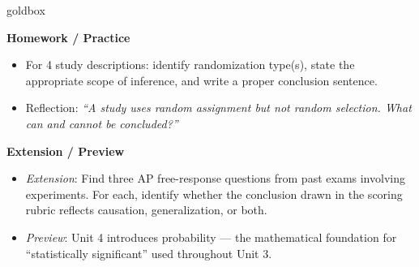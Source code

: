 \documentclass[10pt]{article}
\begin{document}
\begin{skillbox}{goldbox}
\begin{minipage}[t]{0.48\linewidth}
    \textbf{Homework / Practice}
    \begin{itemize}
        \item For 4 study descriptions: identify randomization type(s), state the
              appropriate scope of inference, and write a proper conclusion sentence.
        \item Reflection: \textit{``A study uses random assignment but not random
              selection. What can and cannot be concluded?''}
    \end{itemize}
\end{minipage}
\hfill
\begin{minipage}[t]{0.48\linewidth}
    \textbf{Extension / Preview}
    \begin{itemize}
        \item \textit{Extension}: Find three AP free-response questions from past exams
              involving experiments. For each, identify whether the conclusion drawn in
              the scoring rubric reflects causation, generalization, or both.
        \item \textit{Preview}: Unit 4 introduces probability --- the mathematical
              foundation for ``statistically significant'' used throughout Unit 3.
    \end{itemize}
\end{minipage}
\end{skillbox}
\end{document}
